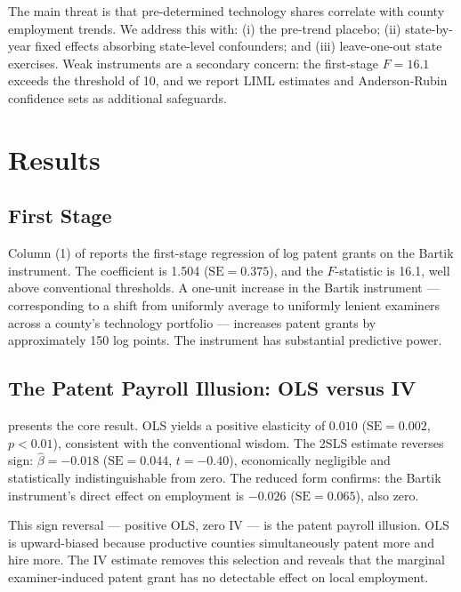 \documentclass[12pt]{article}
\begin{document}
The main threat is that pre-determined technology shares correlate with county employment trends. We address this with: (i) the pre-trend placebo; (ii) state-by-year fixed effects absorbing state-level confounders; and (iii) leave-one-out state exercises. Weak instruments are a secondary concern: the first-stage $F=16.1$ exceeds the \citet{stock2005testing} threshold of 10, and we report LIML estimates and Anderson-Rubin confidence sets as additional safeguards.


\section{Results}
\label{sec:results}

\subsection{First Stage}

Column (1) of  reports the first-stage regression of log patent grants on the Bartik instrument. The coefficient is 1.504 ($\text{SE}=0.375$), and the $F$-statistic is 16.1, well above conventional thresholds. A one-unit increase in the Bartik instrument --- corresponding to a shift from uniformly average to uniformly lenient examiners across a county's technology portfolio --- increases patent grants by approximately 150 log points. The instrument has substantial predictive power.

\subsection{The Patent Payroll Illusion: OLS versus IV}

 presents the core result. OLS yields a positive elasticity of $0.010$ ($\text{SE}=0.002$, $p<0.01$), consistent with the conventional wisdom. The 2SLS estimate reverses sign: $\hat{\beta}=-0.018$ ($\text{SE}=0.044$, $t=-0.40$), economically negligible and statistically indistinguishable from zero. The reduced form confirms: the Bartik instrument's direct effect on employment is $-0.026$ ($\text{SE}=0.065$), also zero.

This sign reversal --- positive OLS, zero IV --- is the patent payroll illusion. OLS is upward-biased because productive counties simultaneously patent more and hire more. The IV estimate removes this selection and reveals that the marginal examiner-induced patent grant has no detectable effect on local employment.
\end{document}
